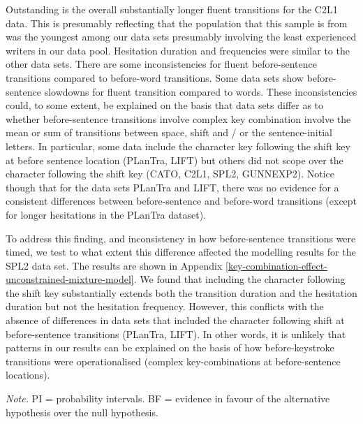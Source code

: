 \begin{appendix}
Outstanding is the overall substantially longer fluent transitions for
the C2L1 data. This is presumably reflecting that the population that
this sample is from was the youngest among our data sets presumably
involving the least experienced writers in our data pool. Hesitation
duration and frequencies were similar to the other data sets. There are
some inconsistencies for fluent before-sentence transitions compared to
before-word transitions. Some data sets show before-sentence slowdowns
for fluent transition compared to words. These inconsistencies could, to
some extent, be explained on the basis that data sets differ as to
whether before-sentence transitions involve complex key combination
involve the mean or sum of transitions between space, shift and / or the
sentence-initial letters. In particular, some data include the character
key following the shift key at before sentence location (PLanTra, LIFT)
but others did not scope over the character following the shift key
(CATO, C2L1, SPL2, GUNNEXP2). Notice though that for the data sets
PLanTra and LIFT, there was no evidence for a consistent differences
between before-sentence and before-word transitions (except for longer
hesitations in the PLanTra dataset).

To address this finding, and inconsistency in how before-sentence
transitions were timed, we test to what extent this difference affected
the modelling results for the SPL2 data set. The results are shown in
Appendix \ref{key-combination-effect-unconstrained-mixture-model}. We
found that including the character following the shift key substantially
extends both the transition duration and the hesitation duration but not
the hesitation frequency. However, this conflicts with the absence of
differences in data sets that included the character following shift at
before-sentence transitions (PLanTra, LIFT). In other words, it is
unlikely that patterns in our results can be explained on the basis of
how before-keystroke transitions were operationalised (complex
key-combinations at before-sentence locations).

\blandscape

\begin{center}
\begin{ThreePartTable}

\begin{TableNotes}[para]
\normalsize{\textit{Note.} PI = probability intervals. BF = evidence in favour of the alternative hypothesis over the null hypothesis.}
\end{TableNotes}


\end{ThreePartTable}
\end{center}
\end{appendix}
